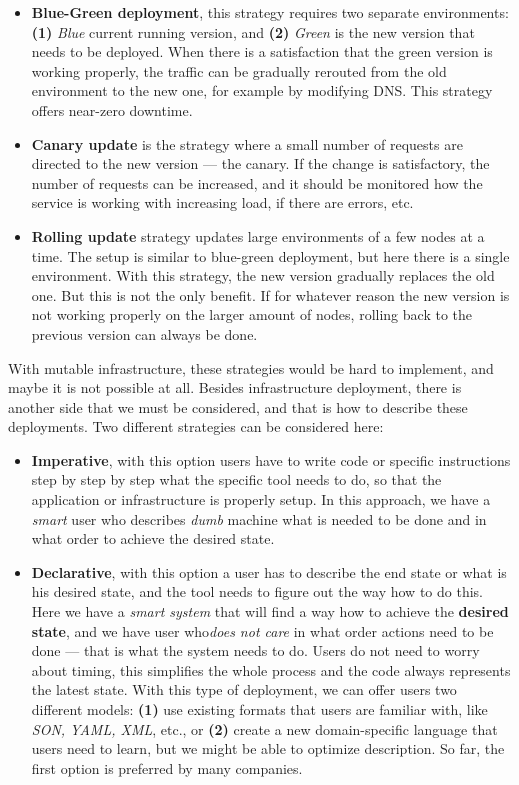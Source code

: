\begin{itemize}
	\item \textbf{Blue-Green deployment}, this strategy requires two separate environments: \textbf{(1)} \textit{Blue} current running version, and \textbf{(2)} \textit{Green} is the new version that needs to be deployed. When there is a satisfaction that the green version is working properly, the traffic can be gradually rerouted from the old environment to the new one,  for example by modifying DNS. This strategy offers near-zero downtime.
	\item \textbf{Canary update} is the strategy where a small number of requests are directed to the new version --- the canary. If the change is satisfactory, the number of requests can be increased, and it should be monitored how the service is working with increasing load, if there are errors, etc.
	\item \textbf{Rolling update} strategy updates large environments of a few nodes at a time. The setup is similar to blue-green deployment, but here there is a single environment. With this strategy, the new version gradually replaces the old one. But this is not the only benefit. If for whatever reason the new version is not working properly on the larger amount of nodes, rolling back to the previous version can always be done.
\end{itemize}

\noindent
With mutable infrastructure, these strategies would be hard to implement, and maybe it is not possible at all. Besides infrastructure deployment, there is another side that we must be considered, and that is how to describe these deployments. Two different strategies can be considered here:

\begin{itemize}
	\item \textbf{Imperative}, with this option users have to write code or specific instructions step by step by step what the specific tool needs to do, so that the application or infrastructure is properly setup. In this approach, we have a \textit{smart} user who describes \textit{dumb} machine what is needed to be done and in what order to achieve the desired state.
	\item \textbf{Declarative}, with this option a user has to describe the end state or what is his desired state, and the tool needs to figure out the way how to do this. Here we have a \textit{smart system} that will find a way how to achieve the \textbf{desired state}, and we have user who\textit{does not care} in what order actions need to be done --- that is what the system needs to do. Users do not need to worry about timing, this simplifies the whole process and the code always represents the latest state. With this type of deployment, we can offer users two different models: \textbf{(1)} use existing formats that users are familiar with, like \textit{SON, YAML, XML}, etc., or \textbf{(2)} create a new domain-specific language that users need to learn, but we might be able to optimize description. So far, the first option is preferred by many companies.
\end{itemize}

